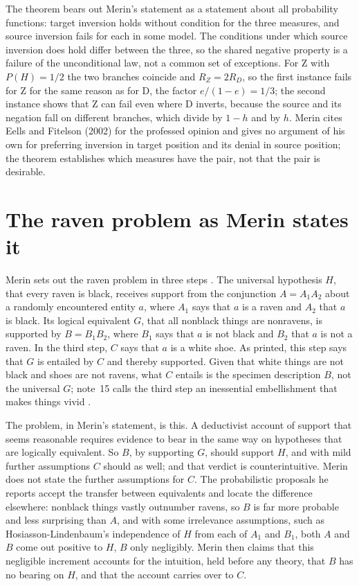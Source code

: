 The theorem bears out Merin's statement as a statement about all
probability functions: target inversion holds without condition for the
three measures, and source inversion fails for each in some model.
The conditions under which source inversion does hold differ between
the three, so the shared negative property is a failure of the
unconditional law, not a common set of exceptions. For Z with
\(P(H)=1/2\) the two branches coincide and \(R_Z=2R_D\), so the first
instance fails for Z for the same reason as for D, the factor
\(e/(1-e)=1/3\); the second instance shows that Z can fail even where
D inverts, because the source and its negation fall on different
branches, which divide by \(1-h\) and by \(h\). Merin cites Eells and
Fitelson (2002) for the professed opinion and gives no argument of his
own for preferring inversion in target position and its denial in
source position; the theorem establishes which measures have the pair,
not that the pair is desirable.

\section{The raven problem as Merin states it}
\label{sec:p15-w02c-p15-027-raven}

Merin sets out the raven problem in three steps
\cite[pp.~271--272]{Merin2021Relevance}. The universal hypothesis \(H\),
that every raven is black, receives support from the conjunction
\(A=A_1A_2\) about a randomly encountered entity \(a\), where \(A_1\)
says that \(a\) is a raven and \(A_2\) that \(a\) is black. Its logical
equivalent \(G\), that all nonblack things are nonravens, is supported
by \(B=B_1B_2\), where \(B_1\) says that \(a\) is not black and \(B_2\)
that \(a\) is not a raven. In the third step, \(C\) says that \(a\) is a
white shoe. As printed, this step says that \(G\) is entailed by \(C\)
and thereby supported. Given that white things are not black and shoes
are not ravens, what \(C\) entails is the specimen description \(B\),
not the universal \(G\); note~15 calls the third step an inessential
embellishment that makes things vivid
\cite[p.~272 and p.~274, n.~15]{Merin2021Relevance}.

The problem, in Merin's statement, is this. A deductivist account of
support that seems reasonable requires evidence to bear in the same way
on hypotheses that are logically equivalent. So \(B\), by supporting \(G\), should support \(H\), and with
mild further assumptions \(C\) should as well; and that verdict is
counterintuitive. Merin does not state the further assumptions for
\(C\). The probabilistic proposals he reports accept the transfer
between equivalents and locate the difference elsewhere: nonblack
things vastly outnumber ravens, so \(B\) is far more probable and less
surprising than \(A\), and with some irrelevance assumptions, such as
Hosiasson-Lindenbaum's independence of \(H\) from each of \(A_1\) and
\(B_1\), both \(A\) and \(B\) come out positive to \(H\), \(B\) only
negligibly. Merin then claims that this negligible increment accounts
for the intuition, held before any theory, that \(B\) has no bearing on
\(H\), and that the account carries over to \(C\).


